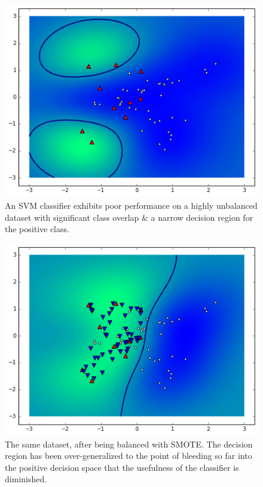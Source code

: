 \documentclass[twoside,11pt]{article}
\begin{document}
\begin{figure}[H]
    \centering
    \includegraphics[scale=.5]{no-balance.png}
    \caption[width=40mm]{An SVM classifier exhibits poor performance on a highly unbalanced dataset with significant class overlap \& a narrow decision region for the positive class.}
    \label{fig:label}
\end{figure}
\begin{figure}[H]
    \centering
    \includegraphics[scale=.5]{smote-balance.png}
    \caption[width=40mm]{The same dataset, after being balanced with SMOTE. The decision region has been over-generalized to the point of bleeding so far into the positive decision space that the usefulness of the classifier is diminished.}
    \label{fig:label}
\end{figure}
\end{document}
